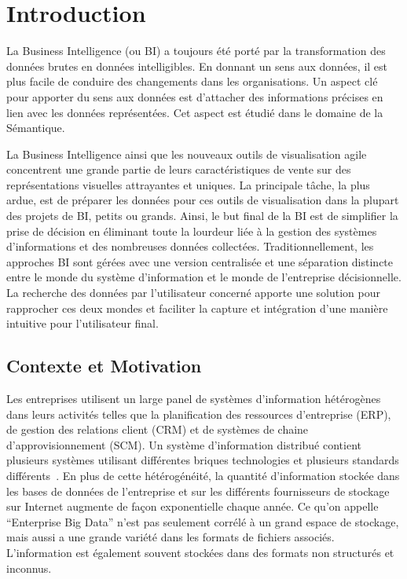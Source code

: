 \chapter{Introduction}\label{french-introduction}
\graphicspath{{summary/figures/}}

\newcommand{\bi}{Business Intelligence }

La Business Intelligence (ou BI) a toujours \'{e}t\'{e} port\'{e} par la transformation des donn\'{e}es brutes en donn\'{e}es intelligibles. En donnant un sens aux donn\'{e}es, il est plus facile de conduire des changements dans les organisations. Un aspect cl\'{e} pour apporter du sens aux donn\'{e}es est d'attacher des informations pr\'{e}cises en lien avec les donn\'{e}es repr\'{e}sent\'{e}es. Cet aspect est \'{e}tudi\'{e} dans le domaine de la S\'{e}mantique.

La \bi ainsi que les nouveaux outils de visualisation agile concentrent une grande partie de leurs caract\'{e}ristiques de vente sur des repr\'{e}sentations visuelles attrayantes et uniques. La principale t\^{a}che, la plus ardue, est de pr\'{e}parer les donn\'{e}es pour ces outils de visualisation dans la plupart des projets de BI, petits ou grands. Ainsi, le but final de la BI est de simplifier la prise de d\'{e}cision en \'{e}liminant toute la lourdeur li\'{e}e \`{a} la gestion des syst\`{e}mes d'informations et des nombreuses donn\'{e}es collect\'{e}es. Traditionnellement, les approches BI sont g\'{e}r\'{e}es avec une version centralis\'{e}e et une s\'{e}paration distincte entre le monde du syst\`{e}me d'information et le monde de l'entreprise d\'{e}cisionnelle. La recherche des donn\'{e}es par l'utilisateur concern\'{e} apporte une solution pour rapprocher ces deux mondes et faciliter la capture et int\'{e}gration d'une mani\`{e}re intuitive pour l'utilisateur final.

\section{Contexte et Motivation}

Les entreprises utilisent un large panel de syst\`{e}mes d'information h\'{e}t\'{e}rog\`{e}nes dans leurs activit\'{e}s telles que la planification des ressources d'entreprise (ERP), de gestion des relations client (CRM) et de syst\`{e}mes de chaine d'approvisionnement (SCM). Un syst\`{e}me d'information distribu\'{e} contient plusieurs syst\`{e}mes utilisant diff\'{e}rentes briques technologies et plusieurs standards diff\'{e}rents~\cite{Mihindukulasooriya:COLD:13}. En plus de cette h\'{e}t\'{e}rog\'{e}n\'{e}it\'{e}, la quantit\'{e} d'information stock\'{e}e dans les bases de donn\'{e}es de l'entreprise et sur les diff\'{e}rents fournisseurs de stockage sur Internet augmente de fa\c{c}on exponentielle chaque ann\'{e}e. Ce qu'on appelle ``Enterprise Big Data'' n'est pas seulement corr\'{e}l\'{e} \`{a} un grand espace de stockage, mais aussi a une grande vari\'{e}t\'{e} dans les formats de fichiers associ\'{e}s. L'information est \'{e}galement souvent stock\'{e}es dans des formats non structur\'{e}s et inconnus.

